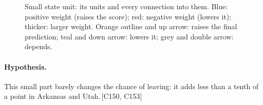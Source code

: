 \documentclass[a4paper,10pt]{article}
\newif\ifreviewmarks
\newcommand{\reviewrule}{\noindent{\color{BrickRed}\rule{\linewidth}{0.8pt}}}
\newenvironment{drafted}[1][]{%
  \ifreviewmarks\par\addvspace{\medskipamount}\reviewrule\par\nopagebreak
  \noindent{\color{BrickRed}\sffamily\footnotesize\textbf{Thesis Draft}\quad #1\hfill review}\par\nopagebreak\smallskip\fi}{%
  \ifreviewmarks\par\smallskip\noindent{\color{BrickRed}\sffamily\footnotesize end of thesis draft}\par\nopagebreak\reviewrule\par\medskip\fi}
\begin{document}
\begin{drafted}[plain-language layer: churn100-s2-c1]
\begin{figure}[H]
{}%
\caption{Small state unit: its units and every connection into them. Blue: positive weight (raises the score); red: negative weight (lowers it); thicker: larger weight. Orange outline and up arrow: raises the final prediction; teal and down arrow: lowers it; grey and double arrow: depends.}
\label{fig:churn100s2c1:units-ann92}
\end{figure}
\paragraph{Hypothesis.} This small part barely changes the chance of leaving: it adds less than a tenth of a point in Arkansas and Utah.\,{\scriptsize\textcolor{NavyBlue}{[C150, C153]}}

\end{drafted}
\end{document}
